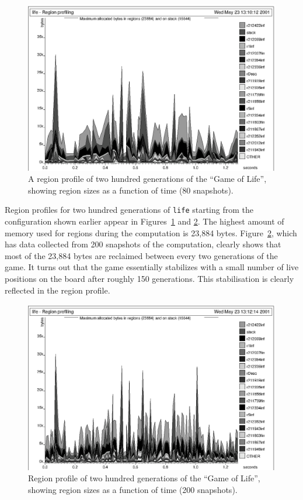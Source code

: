 \documentclass[12pt]{book}
\begin{document}
\begin{figure}
\begin{center}
\includegraphics{life80.ps}
\end{center}
\caption{A region profile of two hundred 
  generations of the ``Game of Life'', showing region sizes as a
  function of time (80 snapshots).}
\label{lifeprof80.fig}
\end{figure}

Region profiles for two hundred generations of {\tt life} starting
from the configuration shown earlier appear in
Figures~\ref{lifeprof80.fig} and \ref{lifeprof200.fig}.  The highest
amount of memory used for regions during the computation is 23,884
bytes. Figure~\ref{lifeprof200.fig}, which has data collected from 200
snapshots of the computation, clearly shows that most of the 23,884
bytes are reclaimed between every two generations of the game. It
turns out that the game essentially stabilizes with a small number of
live positions on the board after roughly 150 generations.  This
stabilisation is clearly reflected in the region profile.

\begin{figure}
\begin{center}
\includegraphics{life200.ps}
\end{center}
\caption{Region profile of two hundred 
  generations of the ``Game of Life'', showing region sizes as a
  function of time (200 snapshots).}
\label{lifeprof200.fig}
\end{figure}
\end{document}
